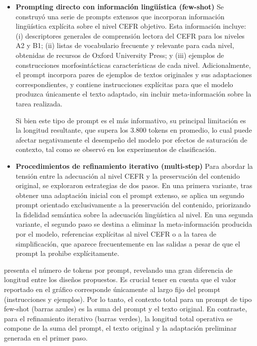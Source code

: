 \begin{itemize}

  \item \textbf{Prompting directo con información lingüística (few-shot)}
  Se construyó una serie de prompts extensos que incorporan información lingüística explícita sobre el nivel CEFR objetivo. Esta información incluye: (i) descriptores generales de comprensión lectora del CEFR para los niveles A2 y B1; (ii) listas de vocabulario frecuente y relevante para cada nivel, obtenidas de recursos de Oxford University Press; y (iii) ejemplos de construcciones morfosintácticas características de cada nivel. Adicionalmente, el prompt incorpora pares de ejemplos de textos originales y sus adaptaciones correspondientes, y contiene instrucciones explícitas para que el modelo produzca únicamente el texto adaptado, sin incluir meta-información sobre la tarea realizada.

  Si bien este tipo de prompt es el más informativo, su principal limitación es la longitud resultante, que supera los 3.800 tokens en promedio, lo cual puede afectar negativamente el desempeño del modelo por efectos de saturación de contexto, tal como se observó en los experimentos de clasificación.

  \item \textbf{Procedimientos de refinamiento iterativo (multi-step)}
  Para abordar la tensión entre la adecuación al nivel CEFR y la preservación del contenido original, se exploraron estrategias de dos pasos. En una primera variante, tras obtener una adaptación inicial con el prompt extenso, se aplica un segundo prompt orientado exclusivamente a la preservación del contenido, priorizando la fidelidad semántica sobre la adecuación lingüística al nivel. En una segunda variante, el segundo paso se destina a eliminar la meta-información producida por el modelo, referencias explícitas al nivel CEFR o a la tarea de simplificación, que aparece frecuentemente en las salidas a pesar de que el prompt la prohibe explícitamente.

\end{itemize}

 presenta el número de tokens por prompt, revelando una gran diferencia de longitud entre los diseños propuestos. Es crucial tener en cuenta que el valor reportado en el gráfico corresponde únicamente al largo fijo del prompt (instrucciones y ejemplos). Por lo tanto, el contexto total para un prompt de tipo few-shot (barras azules) es la suma del prompt y el texto original. En contraste, para el refinamiento iterativo (barras verdes), la longitud total operativa se compone de la suma del prompt, el texto original y la adaptación preliminar generada en el primer paso.


